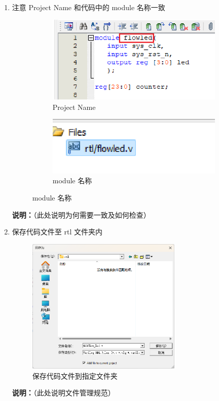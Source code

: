 \documentclass[UTF8]{article}
\theoremstyle{MyLineTheoremStyle} %
\theoremstyle{MyBlockTheoremStyle} %
\theoremstyle{MySubsubsectionStyle} %
\begin{document}
\begin{enumerate}
\vspace{1cm}
    
    \item 注意 Project Name 和代码中的 module 名称一致
    \begin{figure}[H]
        \centering
        \begin{subfigure}{0.5\textwidth}
            \centering
            \includegraphics[width=\linewidth]{step4.png}
            \caption{Project Name}
            \label{fig:step4}
        \end{subfigure}
        \hfill
        \begin{subfigure}{0.45\textwidth}
            \centering
            \includegraphics[width=\linewidth]{step4_2.png}
            \caption{module 名称}
            \label{fig:step4_2}
        \end{subfigure}
    \end{figure}
    \textbf{说明：}（此处说明为何需要一致及如何检查）

\cleardoublepage
    \item 保存代码文件至 rtl 文件夹内
    \begin{figure}[H]
        \centering
        \includegraphics[width=0.7\textwidth]{step5.png}
        \caption{保存代码文件到指定文件夹}
        \label{fig:step5}
    \end{figure}
    \textbf{说明：}（此处说明文件管理规范）


\end{enumerate}
\end{document}
